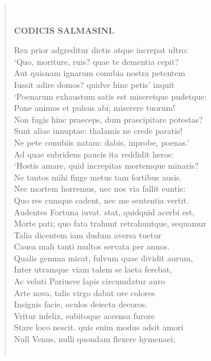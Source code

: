 \documentclass[11pt, a4paper]{report}
\begin{document}
\begin{verse}
        ﻿\pagebreak 
    \begin{center} \textbf{CODICIS SALMASINI.} \end{center} \marginpar{[43]} Rex prior adgreditur dictis atque increpat ultro: \\ ‘Quo, moriture, ruis? quae te dementia cepit? \\ Aut quisnam ignarum conubia nostra petentem \\ Iussit adire domos? quidve hinc petis’ inquit \\ ‘Poenarum exhaustum satis est miseretque pudetque: \\ Pone animos et pulsus abi; miserere tuorum! \\ Non fugis hinc praeceps, dum praecipitare potestas? \\ Sunt aliae innuptae: thalamis ne crede paratis! \\ Ne pete conubiis natam: dabis, inprobe, poenas.’ \\ Ad quae subridens paucis ita reddidit heros: \\ ‘Hostis amare, quid increpitas mortemque minaris? \\ Ne tantos mihi finge metus tam fortibus ausis. \\ Nec mortem horremus, nec nos via fallit euntis: \\ Quo res cumque cadent, nec me sententia vertit. \\ Audentes Fortuna iuvat. stat, quidquid acerbi est, \\ Morte pati; quo fata trahunt retrahuntque, sequamur \\ Talia dicentem iam dudum aversa tuetur \\ Causa mali tanti multos servata per annos. \\ Qualis gemma micat, fulvum quae dividit aurum, \\ Inter utramque viam talem se laeta ferebat, \\ Ac veluti Pariusve lapis circumdatur auro \\ Arte nova, talis virgo dabat ore colores \\ Insignis facie, oculos deiecta decoros. \\ Vritur infelix, subitoque accensa furore \\ Stare loco nescit. quis enim modus adsit amori \\ Null Venus, nulli quondam flexere hymenaei; \\ 
        ﻿\pagebreak 

\end{verse}
\end{document}

